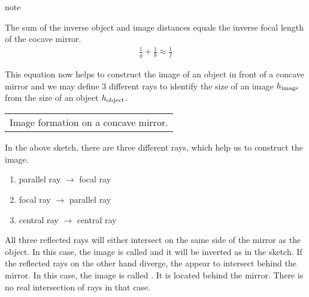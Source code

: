\documentclass[letterpaper,10pt,english]{sphinxmanual}
\begin{document}
\begin{sphinxadmonition}{note}{}\unskip
{}

The sum of the inverse object and image distances equals the inverse focal length of the cocave mirror.
\begin{equation*}
\begin{split}\frac{1}{g}+\frac{1}{b}\approx\frac{1}{f}\end{split}
\end{equation*}\end{sphinxadmonition}

This equation now helps to construct the image of an object in front of a concave mirror and we may define 3 different rays to identify the size of an image \(h_{\rm image}\) from the size of an object \(h_{\rm object}\).


\begin{savenotes}\sphinxattablestart
\centering
\begin{tabulary}{\linewidth}[t]{|T|}
\hline
\sphinxstyletheadfamily 
{}
\\
\hline
{} Image formation on a concave mirror.
\\
\hline
\end{tabulary}
\par
\sphinxattableend\end{savenotes}

In the above sketch, there are three different rays, which help us to construct the image.
\begin{enumerate}
%
\item {} 
 parallel ray \(\rightarrow\) focal ray

\item {} 
 focal ray \(\rightarrow\) parallel ray

\item {} 
 central ray \(\rightarrow\) central ray

\end{enumerate}

All three reflected rays will either intersect on the same side of the mirror as the object. In this case, the image is called  and it will be inverted as in the sketch. If the reflected rays on the other hand diverge, the appear to intersect behind the mirror. In this case, the image is called . It is located behind the mirror. There is no real intersection of rays in that case.
\end{document}
